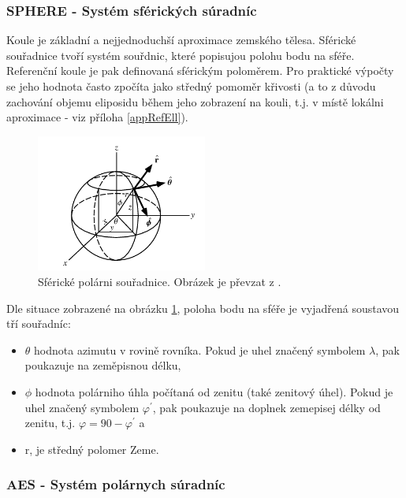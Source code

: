 \subsubsection{SPHERE - Systém sférických súradníc}

Koule je základní a nejjednoduchší aproximace zemského tělesa. Sférické souřadnice tvoří systém souřdnic, které popisujou polohu bodu na sféře. Referenční koule je pak definovaná sférickým poloměrem. Pro praktické výpočty se jeho hodnota často zpočíta jako středný pomoměr křivosti (a to z důvodu zachování objemu eliposidu během jeho zobrazení na kouli, t.j. v místě lokálni aproximace - viz příloha \ref{appRefEll}).
 
\begin{figure}[ht!]
\begin{center}
\includegraphics[width=0.50\textwidth]{FIG/sphere_wolf}
\caption{Sférické polárni souřadnice. Obrázek je převzat z \cite{sphereWolf}.}
\label{fig:sphere}
\end{center}
\end{figure}

Dle situace zobrazené na obrázku \ref{fig:sphere}, poloha bodu na sféře je vyjadřená soustavou tří souřadníc:
\begin{itemize}
\item $\theta$ hodnota azimutu v rovině rovníka. Pokud je uhel značený symbolem $\lambda$, pak poukazuje na zeměpisnou délku,
\item $\phi$ hodnota polárniho úhla počítaná od zenitu (také zenitový úhel). Pokud je uhel značený symbolem $\varphi^{'}$, pak poukazuje na doplnek zemepisej délky od zenitu, t.j. $\varphi = 90 - \varphi^{'}$ a
\item r, je středný polomer Zeme.
\end{itemize}

\newpage

\subsubsection{AES - Systém polárnych súradníc}

